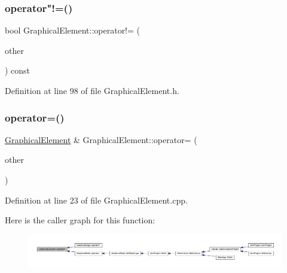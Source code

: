 \subsubsection{\texorpdfstring{operator"!=()}{operator!=()}}
{\footnotesize\ttfamily bool Graphical\+Element\+::operator!= (\begin{DoxyParamCaption}\item[{const \hyperlink{class_graphical_element}{Graphical\+Element} \&}]{other }\end{DoxyParamCaption}) const\hspace{0.3cm}{\ttfamily [inline]}}



Definition at line 98 of file Graphical\+Element.\+h.

\mbox{\label{class_graphical_element_add7f7f8fe319b3d966ffe3e756ef7b2e}} 
\subsubsection{\texorpdfstring{operator=()}{operator=()}}
{\footnotesize\ttfamily \hyperlink{class_graphical_element}{Graphical\+Element} \& Graphical\+Element\+::operator= (\begin{DoxyParamCaption}\item[{const \hyperlink{class_graphical_element}{Graphical\+Element} \&}]{other }\end{DoxyParamCaption})}



Definition at line 23 of file Graphical\+Element.\+cpp.

Here is the caller graph for this function\+:
\nopagebreak
\begin{figure}[H]
\begin{center}
\leavevmode
\includegraphics[width=350pt]{class_graphical_element_add7f7f8fe319b3d966ffe3e756ef7b2e_icgraph}
\end{center}
\end{figure}
\mbox{\label{class_graphical_element_a4bbe253b3e4455a4084de813cf2235a8}} 
